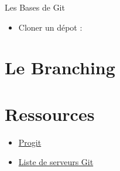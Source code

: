 \documentclass{beamer}
\begin{document}
\begin{frame}{Les Bases de Git}
\begin{itemize}
\item Cloner un dépot :
\end{itemize}

\end{frame}

\section{Le Branching}
\begin{frame}{}
\end{frame}


\section{Ressources}
\begin{frame}{}
\begin{itemize}
\item \href{http://progit.org/about.html}{Progit}
\item \href{http://git.or.cz/gitwiki/GitHosting}{Liste de serveurs Git}

\end{itemize}
\end{frame}
\end{document}
